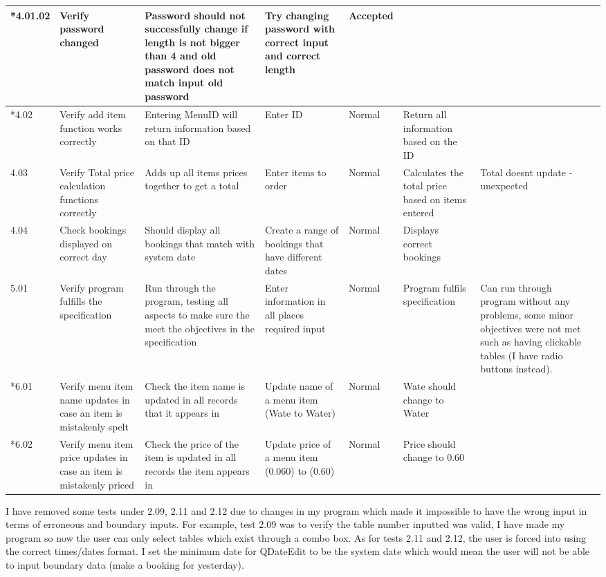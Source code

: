 \begin{landscape}
\begin{center}
\begin{longtable}{|p{1.5cm}|p{2.5cm}|p{2.5cm}|p{2cm}|p{2cm}|p{2cm}|p{2cm}|p{2cm}|}
      \rowcolor{gray}   *4.01.02 & Verify password changed & Password should not successfully change if length is not bigger than 4 and old password does not match input old password   &  Try changing password with correct input and correct length&Accepted  & & \\ \hline
       \rowcolor{gray}  *4.02 & Verify add item function works correctly & Entering MenuID will return information based on that ID & Enter ID &  Normal & Return all information based on the ID  & & \\ \hline
        4.03 & Verify Total price calculation functions correctly & Adds up all items prices together to get a total & Enter items to order &  Normal & Calculates the total price based on items entered  & Total doesnt update - unexpected & \\ \hline
	4.04 & Check bookings displayed on correct day & Should display all bookings that match with system date & Create a range of bookings that have different dates & Normal& Displays correct bookings & & \\ \hline
         5.01 & Verify program fulfills the specification & Run through the program, testing all aspects to make sure the meet the objectives in the specification & Enter information in all places required input &  Normal & Program fulfils specification  & Can run through program without any problems, some minor objectives were not met such as having clickable tables (I have radio buttons instead). & \\ \hline
	 \rowcolor{gray}*6.01 & Verify menu item name updates in case an item is mistakenly spelt & Check  the item name is updated in all records that it appears in & Update name of a menu item (Wate to Water) & Normal & Wate should change to Water & & \\ \hline
	 \rowcolor{gray}*6.02 & Verify menu item price updates in case an item is mistakenly priced & Check the price of the item is updated in all records the item appears in & Update price of a menu item (0.060) to (0.60) & Normal & Price should change to 0.60 & & \\ \hline






    \end{longtable}
\end{center}
	I have removed some tests under 2.09, 2.11 and 2.12 due to changes in my program which made it impossible to have the wrong input in terms of erroneous and boundary inputs. For example, test 2.09 was to verify the table number inputted was valid, I have made my program so now the user can only select tables which exist through a combo box. As for tests 2.11 and 2.12, the user is forced into using the correct times/dates format. I set the minimum date for QDateEdit to be the system date which would mean the user will not be able to input boundary data (make a booking for yesterday).


\end{landscape}

